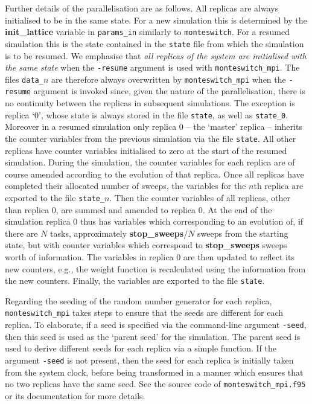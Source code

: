 \documentclass{report}
\begin{document}
Further details of the parallelisation are as follows. All replicas are always initialised to be in the same state. For a new simulation this is 
determined by the \textbf{init\_lattice} variable in \texttt{params\_in} similarly to \texttt{monteswitch}. For a resumed simulation this is the state 
contained in the \texttt{state} file from which the simulation is to be resumed. We emphasise that \emph{all replicas of the system are initialised with 
the same state} when the \texttt{-resume} argument is used with \texttt{monteswitch\_mpi}. 
The files \texttt{data\_}$n$ are therefore always overwritten by \texttt{monteswitch\_mpi} when the \texttt{-resume} argument is
invoked since, given the nature of the parallelisation, there is no continuity between the replicas in subsequent simulations. The exception is replica `0',
whose state is always stored in the file \texttt{state}, as well as \texttt{state\_0}.
%
Moreover in a resumed simulation only replica 0 -- the `master' replica -- inherits the counter variables from the previous 
simulation via the file \texttt{state}. All other replicas have counter variables initialised to zero at the start of the resumed simulation.
During the simulation, the counter variables for each replica are of course amended according to the evolution of that replica. Once all replicas have
completed their allocated number of sweeps, the variables for the $n$th replica are exported to the file \texttt{state\_}$n$. Then 
the counter variables of all replicas, other than replica 0, are summed and amended to replica 0. At the end of the simulation replica 0 thus has
variables which corresponding to an evolution of, if there are $N$ tasks, approximately \textbf{stop\_sweeps}$/N$ sweeps from the starting state, 
but with counter variables which correspond to \textbf{stop\_sweeps} sweeps worth of information. The variables in replica 0 are then updated to reflect 
its new counters, e.g., the weight function is recalculated using the information from the new counters. Finally, the variables are
exported to the file \texttt{state}.

Regarding the seeding of the random number generator for each replica, \texttt{monteswitch\_mpi} takes steps to ensure that the seeds are
different for each replica. To elaborate, if a seed is specified via the command-line argument \texttt{-seed}, then this seed is
used as the `parent seed' for the simulation. The parent seed is used to derive different seeds for each replica via a simple function. If the
argument \texttt{-seed} is not present, then the seed for each replica is initially taken from the system clock, before being transformed
in a manner which ensures that no two replicas have the same seed. See the source code of \texttt{monteswitch\_mpi.f95} or its documentation
for more details.
\end{document}
